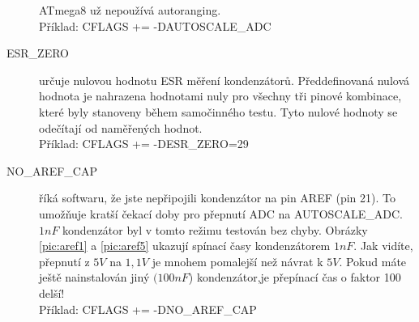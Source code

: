 \begin{description}
ATmega8 už nepoužívá autoranging.\\
Příklad: CFLAGS += -DAUTOSCALE\_ADC
  \item[ESR\_ZERO] určuje nulovou hodnotu ESR měření kondenzátorů.
Předdefinovaná nulová hodnota je nahrazena hodnotami nuly pro všechny tři pinové kombinace,
které byly stanoveny během samočinného testu.
Tyto nulové hodnoty se odečítají od naměřených hodnot.\\
Příklad: CFLAGS += -DESR\_ZERO=29
  \item[NO\_AREF\_CAP]  říká softwaru, že jste nepřipojili kondenzátor na pin AREF (pin 21).
To umožňuje kratší čekací doby pro přepnutí ADC na AUTOSCALE\_ADC.
\(1nF\) kondenzátor byl v tomto režimu testován bez chyby.
Obrázky \ref{pic:aref1} a \ref{pic:aref5} ukazují spínací časy kondenzátorem \(1nF\).
Jak vidíte, přepnutí z \(5V\) na \(1,1V\) je mnohem pomalejší než návrat k \(5V\).
Pokud máte ještě nainstalován jiný \((100nF\)) kondenzátor,je přepínací čas o faktor 100 delší!\\
Příklad: CFLAGS += -DNO\_AREF\_CAP
\end{description}

